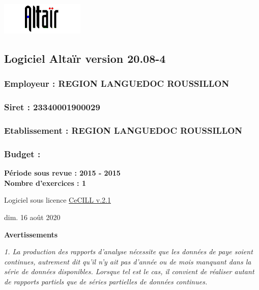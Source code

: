 \includegraphics{icones/altair.png}

\hypertarget{logiciel-altair-version-20.08-4}{%
\subsection{Logiciel Altaïr version
20.08-4}\label{logiciel-altair-version-20.08-4}}

\hypertarget{employeur-region-languedoc-roussillon}{%
\subsubsection{Employeur : REGION LANGUEDOC
ROUSSILLON}\label{employeur-region-languedoc-roussillon}}

\hypertarget{siret-23340001900029}{%
\subsubsection{Siret : 23340001900029}\label{siret-23340001900029}}

\hypertarget{etablissement-region-languedoc-roussillon}{%
\subsubsection{Etablissement : REGION LANGUEDOC
ROUSSILLON}\label{etablissement-region-languedoc-roussillon}}

\hypertarget{budget}{%
\subsubsection{Budget :}\label{budget}}

\textbf{Période sous revue : 2015 - 2015 }\\
\textbf{Nombre d'exercices : 1 }

Logiciel sous licence \href{../Docs/LICENCE.html}{CeCILL v.2.1}

dim. 16 août 2020

\textbf{Avertissements}

\emph{1. La production des rapports d'analyse nécessite que les données
de paye soient continues, autrement dit qu'il n'y ait pas d'année ou de
mois manquant dans la série de données disponibles. Lorsque tel est le
cas, il convient de réaliser autant de rapports partiels que de séries
partielles de données continues.}

